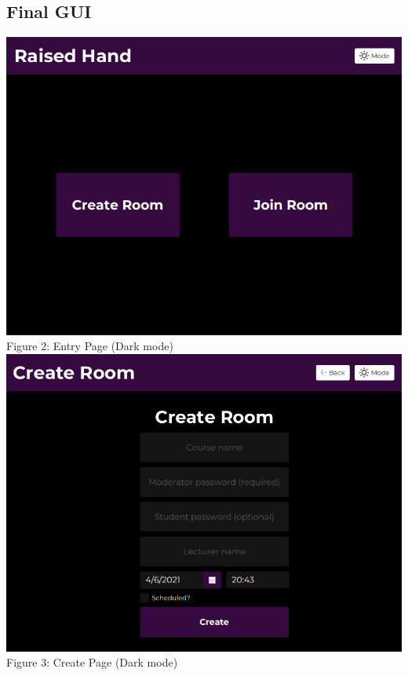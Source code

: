 \documentclass{article}
\begin{document}
    \begin{appendices}

        \section{Final GUI}
        \label{appendix:GUI}
        \includegraphics[scale=0.6]{Entry.png}\\
        Figure 2: Entry Page (Dark mode)\\
        \includegraphics[scale=0.6]{Create.png}\\
        Figure 3: Create Page (Dark mode)\\

\end{appendices}
\end{document}
